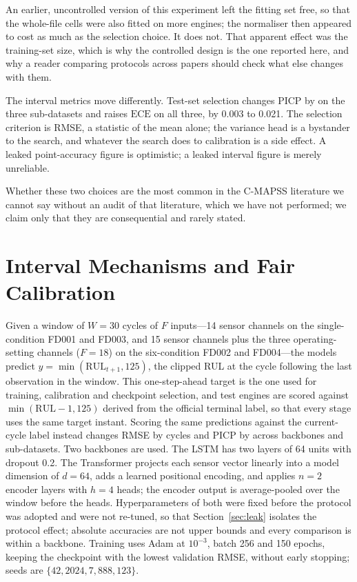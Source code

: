 \documentclass[journal]{IEEEtran}
\newcommand{\PICP}{\mathrm{PICP}}\newcommand{\MPIW}{\mathrm{MPIW}}\newcommand{\ECE}{\mathrm{ECE}}
\begin{document}
An earlier, uncontrolled version of this experiment left the fitting set free, so that the whole-file cells were also fitted on more engines; the normaliser then appeared to cost as much as the selection choice. It does not. That apparent effect was the training-set size, which is why the controlled design is the one reported here, and why a reader comparing protocols across papers should check what else changes with them.

The interval metrics move differently. Test-set selection changes $\PICP$ by \NSelPICP on the three sub-datasets and raises $\ECE$ on all three, by 0.003 to 0.021. The selection criterion is RMSE, a statistic of the mean alone; the variance head is a bystander to the search, and whatever the search does to calibration is a side effect. A leaked point-accuracy figure is optimistic; a leaked interval figure is merely unreliable.

Whether these two choices are the most common in the C-MAPSS literature we cannot say without an audit of that literature, which we have not performed; we claim only that they are consequential and rarely stated.

\section{Interval Mechanisms and Fair Calibration}
\label{sec:mechanisms}
Given a window of $W=30$ cycles of $F$ inputs---14 sensor channels on the single-condition FD001 and FD003, and 15 sensor channels plus the three operating-setting channels ($F=18$) on the six-condition FD002 and FD004---the models predict $y=\min(\mathrm{RUL}_{t+1},125)$, the clipped RUL at the cycle following the last observation in the window. This one-step-ahead target is the one used for training, calibration and checkpoint selection, and test engines are scored against $\min(\mathrm{RUL}-1,125)$ derived from the official terminal label, so that every stage uses the same target instant. Scoring the same predictions against the current-cycle label instead changes RMSE by \NAlignRMSE{} cycles and $\PICP$ by \NAlignPICP{} across backbones and sub-datasets. Two backbones are used. The LSTM has two layers of 64 units with dropout 0.2. The Transformer projects each sensor vector linearly into a model dimension of $d=64$, adds a learned positional encoding, and applies $n=2$ encoder layers with $h=4$ heads; the encoder output is average-pooled over the window before the heads. Hyperparameters of both were fixed before the protocol was adopted and were not re-tuned, so that Section~\ref{sec:leak} isolates the protocol effect; absolute accuracies are not upper bounds and every comparison is within a backbone. Training uses Adam at $10^{-3}$, batch 256 and 150 epochs, keeping the checkpoint with the lowest validation RMSE, without early stopping; seeds are $\{42, 2024, 7, 888, 123\}$.
\end{document}
